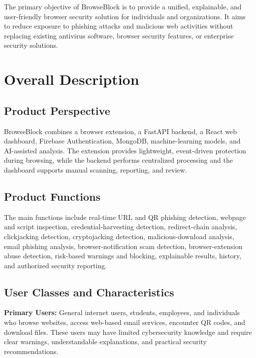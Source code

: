 \documentclass[12pt,a4paper]{report}
\begin{document}
The primary objective of BrowseBlock is to provide a unified, explainable, and user-friendly browser security solution for individuals and organizations. It aims to reduce exposure to phishing attacks and malicious web activities without replacing existing antivirus software, browser security features, or enterprise security solutions.\par

\chapter{Overall Description}

\section{Product Perspective}

BrowseBlock combines a browser extension, a FastAPI backend, a React web dashboard, Firebase Authentication, MongoDB, machine-learning models, and AI-assisted analysis. The extension provides lightweight, event-driven protection during browsing, while the backend performs centralized processing and the dashboard supports manual scanning, reporting, and review.\par

\section{Product Functions}

The main functions include real-time URL and QR phishing detection, webpage and script inspection, credential-harvesting detection, redirect-chain analysis, clickjacking detection, cryptojacking detection, malicious-download analysis, email phishing analysis, browser-notification scam detection, browser-extension abuse detection, risk-based warnings and blocking, explainable results, history, and authorized security reporting.\par

\section{User Classes and Characteristics}

\textbf{Primary Users:} General internet users, students, employees, and individuals who browse websites, access web-based email services, encounter QR codes, and download files. These users may have limited cybersecurity knowledge and require clear warnings, understandable explanations, and practical security recommendations.\par
\end{document}
